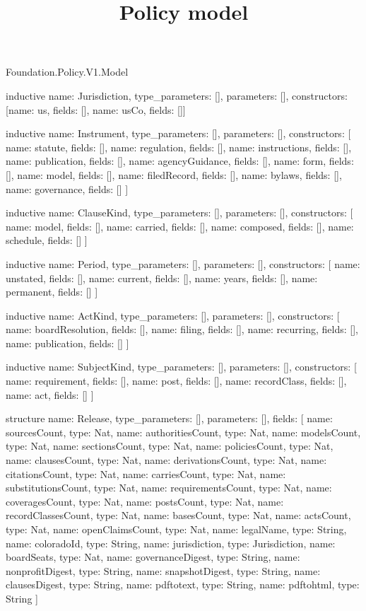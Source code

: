 \begin{lexlean}{Foundation.Policy.V1.Model}
\title{Policy model}
\begin{semanticmodule}
inductive{
  name: Jurisdiction,
  type_parameters: [],
  parameters: [],
  constructors: [{name: us, fields: []}, {name: usCo, fields: []}]
}

inductive{
  name: Instrument,
  type_parameters: [],
  parameters: [],
  constructors: [
    {name: statute, fields: []},
    {name: regulation, fields: []},
    {name: instructions, fields: []},
    {name: publication, fields: []},
    {name: agencyGuidance, fields: []},
    {name: form, fields: []},
    {name: model, fields: []},
    {name: filedRecord, fields: []},
    {name: bylaws, fields: []},
    {name: governance, fields: []}
  ]
}

inductive{
  name: ClauseKind,
  type_parameters: [],
  parameters: [],
  constructors: [
    {name: model, fields: []},
    {name: carried, fields: []},
    {name: composed, fields: []},
    {name: schedule, fields: []}
  ]
}

inductive{
  name: Period,
  type_parameters: [],
  parameters: [],
  constructors: [
    {name: unstated, fields: []},
    {name: current, fields: []},
    {name: years, fields: []},
    {name: permanent, fields: []}
  ]
}

inductive{
  name: ActKind,
  type_parameters: [],
  parameters: [],
  constructors: [
    {name: boardResolution, fields: []},
    {name: filing, fields: []},
    {name: recurring, fields: []},
    {name: publication, fields: []}
  ]
}

inductive{
  name: SubjectKind,
  type_parameters: [],
  parameters: [],
  constructors: [
    {name: requirement, fields: []},
    {name: post, fields: []},
    {name: recordClass, fields: []},
    {name: act, fields: []}
  ]
}

structure{
  name: Release,
  type_parameters: [],
  parameters: [],
  fields: [
    {name: sourcesCount, type: Nat},
    {name: authoritiesCount, type: Nat},
    {name: modelsCount, type: Nat},
    {name: sectionsCount, type: Nat},
    {name: policiesCount, type: Nat},
    {name: clausesCount, type: Nat},
    {name: derivationsCount, type: Nat},
    {name: citationsCount, type: Nat},
    {name: carriesCount, type: Nat},
    {name: substitutionsCount, type: Nat},
    {name: requirementsCount, type: Nat},
    {name: coveragesCount, type: Nat},
    {name: postsCount, type: Nat},
    {name: recordClassesCount, type: Nat},
    {name: basesCount, type: Nat},
    {name: actsCount, type: Nat},
    {name: openClaimsCount, type: Nat},
    {name: legalName, type: String},
    {name: coloradoId, type: String},
    {name: jurisdiction, type: Jurisdiction},
    {name: boardSeats, type: Nat},
    {name: governanceDigest, type: String},
    {name: nonprofitDigest, type: String},
    {name: snapshotDigest, type: String},
    {name: clausesDigest, type: String},
    {name: pdftotext, type: String},
    {name: pdftohtml, type: String}
  ]
}


\end{semanticmodule}
\end{lexlean}
